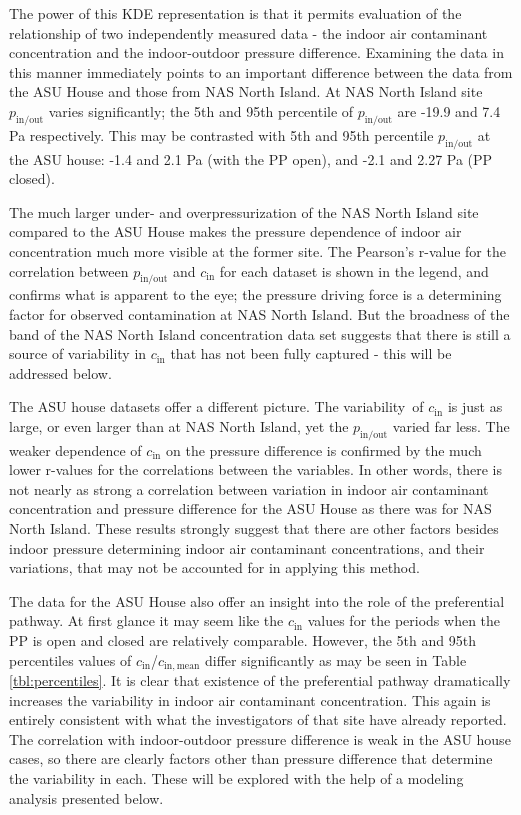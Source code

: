 The power of this KDE representation is that it permits evaluation of the relationship of two independently measured data - the indoor air contaminant concentration and the indoor-outdoor pressure difference.
Examining the data in this manner immediately points to an important difference between the data from the ASU House and those from NAS North Island.
At NAS North Island site $p_\mathrm{in/out}$ varies significantly; the 5th and 95th percentile of $p_\mathrm{in/out}$ are -19.9 and 7.4 Pa respectively.
This may be contrasted with 5th and 95th percentile $p_\mathrm{in/out}$ at the ASU house: -1.4 and 2.1 Pa (with the PP open), and -2.1 and 2.27 Pa (PP closed).\par

The much larger under- and overpressurization of the NAS North Island site compared to the ASU House makes the pressure dependence of indoor air concentration much more visible at the former site.
The Pearson’s r-value for the correlation between $p_\mathrm{in/out}$ and $c_\mathrm{in}$ for each dataset is shown in the legend, and confirms what is apparent to the eye; the pressure driving force is a determining factor for observed contamination at NAS North Island.
But the broadness of the band of the NAS North Island concentration data set suggests that there is still a source of variability in $c_\mathrm{in}$ that has not been fully captured - this will be addressed below.\par

The ASU house datasets offer a different picture.
The variability of $c_\mathrm{in}$ is just as large, or even larger than at NAS North Island, yet the $p_\mathrm{in/out}$ varied far less.
The weaker dependence of $c_\mathrm{in}$ on the pressure difference is confirmed by the much lower r-values for the correlations between the variables.
In other words, there is not nearly as strong a correlation between variation in indoor air contaminant concentration and pressure difference for the ASU House as there was for NAS North Island.
These results strongly suggest that there are other factors besides indoor pressure determining indoor air contaminant concentrations, and their variations, that may not be accounted for in applying this method.\par

The data for the ASU House also offer an insight into the role of the preferential pathway.
At first glance it may seem like the $c_\mathrm{in}$ values for the periods when the PP is open and closed are relatively comparable.
However, the 5th and 95th percentiles values of $c_\mathrm{in}$/$c_\mathrm{in,mean}$ differ significantly as may be seen in Table \ref{tbl:percentiles}.
It is clear that existence of the preferential pathway dramatically increases the variability in indoor air contaminant concentration.
This again is entirely consistent with what the investigators of that site have already reported\cite{guo_identification_2015}.
The correlation with indoor-outdoor pressure difference is weak in the ASU house cases, so there are clearly factors other than pressure difference that determine the variability in each.
These will be explored with the help of a modeling analysis presented below.\par

